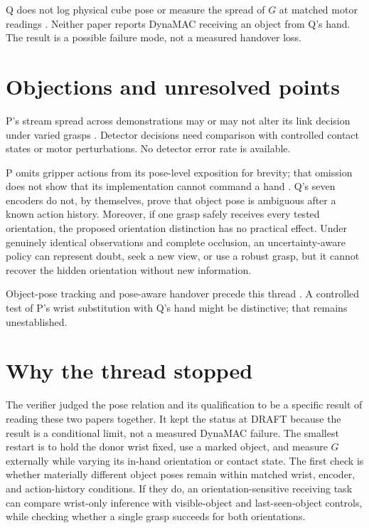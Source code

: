 \documentclass{article}
\begin{document}
Q does not log physical cube pose or measure the spread of \(G\) at matched motor readings \cite{q}.
Neither paper reports DynaMAC receiving an object from Q's hand. The result is a possible failure
mode, not a measured handover loss.

\section{Objections and unresolved points}

P's stream spread across demonstrations may or may not alter its link decision under varied grasps
\cite{p}. Detector decisions need comparison with controlled contact states or motor perturbations.
No detector error rate is available.

P omits gripper actions from its pose-level exposition for brevity; that omission does not show that
its implementation cannot command a hand \cite{p}. Q's seven encoders do not, by themselves, prove
that object pose is ambiguous after a known action history. Moreover, if one grasp safely receives
every tested orientation, the proposed orientation distinction has no practical effect. Under
genuinely identical observations and complete occlusion, an uncertainty-aware policy can represent
doubt, seek a new view, or use a robust grasp, but it cannot recover the hidden orientation without
new information.

Object-pose tracking and pose-aware handover precede this thread \cite{liang2020,vezzani2017}. A
controlled test of P's wrist substitution with Q's hand might be distinctive; that remains
unestablished.

\section{Why the thread stopped}

The verifier judged the pose relation and its qualification to be a specific result of reading these
two papers together. It kept the status at DRAFT because the result is a conditional limit, not a
measured DynaMAC failure. The smallest restart is to hold the donor wrist fixed, use a marked
object, and measure \(G\) externally while varying its in-hand orientation or contact state. The
first check is whether materially different object poses remain within matched wrist, encoder, and
action-history conditions. If they do, an orientation-sensitive receiving task can compare
wrist-only inference with visible-object and last-seen-object controls, while checking whether a
single grasp succeeds for both orientations.



\end{document}
